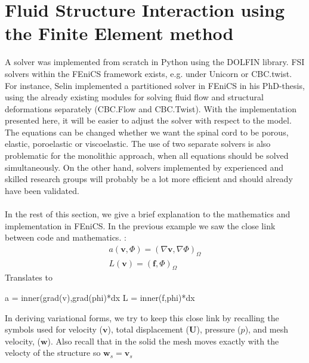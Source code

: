 \section{Fluid Structure Interaction using the Finite Element method}
A solver was implemented from scratch in Python using the DOLFIN library. FSI solvers within the FEniCS framework exists, e.g. under Unicorn or CBC.twist. For instance, Selin \cite{Seli11} implemented a partitioned solver in FEniCS in his PhD-thesis, using the already existing modules for solving fluid flow and structural deformations separately (CBC.Flow and CBC.Twist). With the implementation presented here, it will be easier to adjust the solver with respect to the model. The equations can be changed whether we want the spinal cord to be porous, elastic, poroelastic or viscoelastic. The use of two separate solvers is also problematic for the monolithic approach, when all equations should be solved simultaneously. On the other hand, solvers implemented by experienced and skilled research groups will probably be a lot more efficient and should already have been validated. 
\\
\\
In the rest of this section, we give a brief explanation to the mathematics and implementation in FEniCS. In the previous example we saw the close link between code and mathematics. :
\begin{align*}
a(\mathbf{v},\Phi) = (\nabla \mathbf{v}, \nabla \Phi)_\Omega \\
L(\mathbf{v}) = (\mathbf{f},\Phi)_\Omega
\end{align*}
Translates to
\begin{center}
\begin{cverbatim}
a = inner(grad(v),grad(phi)*dx
L = inner(f,phi)*dx
\end{cverbatim}
\end{center}
In deriving variational forms, we try to keep this close link by recalling the symbols used for velocity ($\mathbf{v}$), total displacement ($\mathbf{U}$), pressure ($p$), and mesh velocity, ($\mathbf{w}$). Also recall that in the solid the mesh moves exactly with the velocty of the structure so $\mathbf{w}_s = \mathbf{v}_s$
\\
